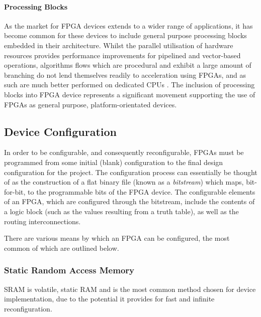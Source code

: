 \paragraph{Processing Blocks}
\label{fpga:architecture:processor}
As the market for \gls{FPGA} devices extends to a wider range of applications,
it has become common for these devices to include general purpose processing
blocks embedded in their architecture. Whilst the parallel utilisation of
hardware resources provides performance improvements for pipelined and
vector-based operations, algorithms flows which are procedural and exhibit a
large amount of branching do not lend themselves readily to acceleration using
\glspl{FPGA}, and as such are much better performed on dedicated \glspl{CPU}
\cite{Hauck:2007}. The inclusion of processing blocks into \gls{FPGA} device
represents a significant movement supporting the use of \glspl{FPGA} as general
purpose, platform-orientated devices.

\subsection{Device Configuration}
\label{fpga:configuration}
In order to be configurable, and consequently reconfigurable, \glspl{FPGA} must
be programmed from some initial (blank) configuration to the final design
configuration for the project. The configuration process can essentially be
thought of as the construction of a flat binary file (known as a
\emph{bitstream}) which maps, bit-for-bit, to the programmable bits of the
\gls{FPGA} device. The configurable elements of an \gls{FPGA}, which are
configured through the bitstream, include the contents of a logic block (such as
the values resulting from a truth table), as well as the routing
interconnections.

There are various means by which an \gls{FPGA} can be configured, the most
common of which are outlined below.

\subsubsection{Static Random Access Memory}
\label{fpga:configuration:sram}
\gls{SRAM} is volatile, static \gls{RAM} and is the most common method chosen
for device implementation, due to the potential it provides for fast and
infinite reconfiguration.

